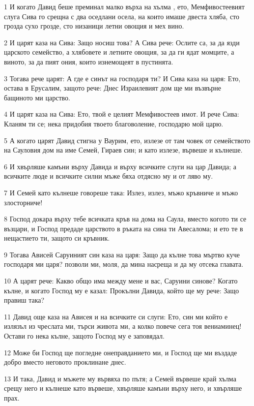 \par 1 И когато Давид беше преминал малко върха на хълма , ето, Мемфивостеевият слуга Сива го срещна с два оседлани осела, на които имаше двеста хляба, сто грозда сухо грозде, сто низаници летни овощия и мех вино.
\par 2 И царят каза на Сива: Защо носиш това? А Сива рече: Ослите са, за да язди царското семейство, а хлябовете и летните овощия, за да ги ядат момците, а виното, за да пият ония, които изнемощеят в пустинята.
\par 3 Тогава рече царят: А где е синът на господаря ти? И Сива каза на царя: Ето, остава в Ерусалим, защото рече: Днес Израилевият дом ще ми възвърне бащиното ми царство.
\par 4 И царят каза на Сива: Ето, твой е целият Мемфивостеев имот. И рече Сива: Кланям ти се; нека придобия твоето благоволение, господарю мой царю.
\par 5 А когато царят Давид стигна у Ваурим, ето, излезе от там човек от семейството на Сауловия дом на име Семей, Гираев син; и като излезе, вървеше и кълнеше.
\par 6 И хвърляше камъни върху Давида и върху всичките слуги на цар Давида; а всичките люде и всичките силни мъже бяха отдясно му и от ляво му.
\par 7 И Семей като кълнеше говореше така: Излез, излез, мъжо кръвниче и мъжо злосторниче!
\par 8 Господ докара върху тебе всичката кръв на дома на Саула, вместо когото ти се възцари, и Господ предаде царството в ръката на сина ти Авесалома; и ето те в нещастието ти, защото си кръвник.
\par 9 Тогава Ависей Саруиният син каза на царя: Защо да кълне това мъртво куче господаря ми царя? позволи ми, моля, да мина насреща и да му отсека главата.
\par 10 А царят рече: Какво общо има между мене и вас, Саруини синове? Когато кълне, и когато Господ му е казал: Прокълни Давида, който ще му рече: Защо правиш така?
\par 11 Давид още каза на Ависея и на всичките си слуги: Ето, син ми който е излязъл из чреслата ми, търси живота ми, а колко повече сега тоя вениаминец! Остави го нека кълне, защото Господ му е заповядал.
\par 12 Може би Господ ще погледне онеправданието ми, и Господ ще ми въздаде добро вместо неговото проклинане днес.
\par 13 И така, Давид и мъжете му вървяха по пътя; а Семей вървеше край хълма срещу него и кълнеше като вървеше, хвърляше камъни върху него, и хвърляше прах.
